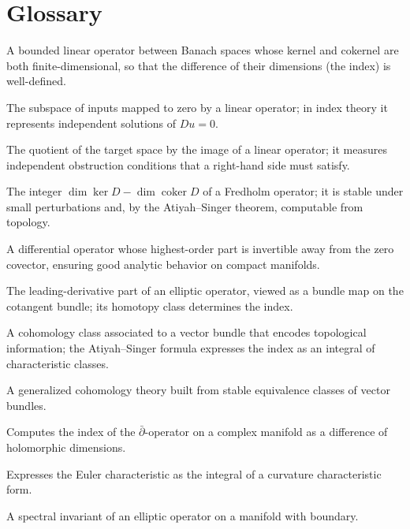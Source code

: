 \section*{Glossary}
\begin{description}[leftmargin=*,style=nextline,itemsep=0.3em]
\item[\textbf{Fredholm operator.}] A bounded linear operator between Banach spaces whose kernel and cokernel are both finite-dimensional, so that the difference of their dimensions (the index) is well-defined.
\item[\textbf{Kernel.}] The subspace of inputs mapped to zero by a linear operator; in index theory it represents independent solutions of $Du=0$.
\item[\textbf{Cokernel.}] The quotient of the target space by the image of a linear operator; it measures independent obstruction conditions that a right-hand side must satisfy.
\item[\textbf{Index.}] The integer $\dim\ker D - \dim\operatorname{coker} D$ of a Fredholm operator; it is stable under small perturbations and, by the Atiyah--Singer theorem, computable from topology.
\item[\textbf{Elliptic operator.}] A differential operator whose highest-order part is invertible away from the zero covector, ensuring good analytic behavior on compact manifolds.
\item[\textbf{Symbol.}] The leading-derivative part of an elliptic operator, viewed as a bundle map on the cotangent bundle; its homotopy class determines the index.
\item[\textbf{Characteristic class.}] A cohomology class associated to a vector bundle that encodes topological information; the Atiyah--Singer formula expresses the index as an integral of characteristic classes.
\item[\textbf{K-theory.}] A generalized cohomology theory built from stable equivalence classes of vector bundles.
\item[\textbf{Riemann--Roch theorem.}] Computes the index of the $\bar\partial$-operator on a complex manifold as a difference of holomorphic dimensions.
\item[\textbf{Chern--Gauss--Bonnet theorem.}] Expresses the Euler characteristic as the integral of a curvature characteristic form.
\item[\textbf{Eta invariant.}] A spectral invariant of an elliptic operator on a manifold with boundary.
\end{description}
